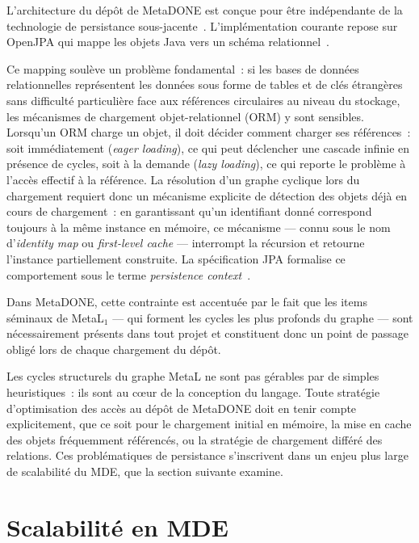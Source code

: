 L'architecture du dépôt de MetaDONE est conçue pour être indépendante de la technologie de persistance sous-jacente~\cite{Eng2007}. L'implémentation courante repose sur OpenJPA qui mappe les objets Java vers un schéma relationnel~\cite{jpa2013}.

Ce mapping soulève un problème fondamental~: si les bases de données relationnelles représentent les données sous forme de tables et de clés étrangères sans difficulté particulière face aux références circulaires au niveau du stockage, les mécanismes de chargement objet-relationnel (ORM) y sont sensibles. Lorsqu'un ORM charge un objet, il doit décider comment charger ses références~: soit immédiatement (\textit{eager loading}), ce qui peut déclencher une cascade infinie en présence de cycles, soit à la demande (\textit{lazy loading}), ce qui reporte le problème à l'accès effectif à la référence. La résolution d'un graphe cyclique lors du chargement requiert donc un mécanisme explicite de détection des objets déjà en cours de chargement~: en garantissant qu'un identifiant donné correspond toujours à la même instance en mémoire, ce mécanisme --- connu sous le nom d'\textit{identity map} ou \textit{first-level cache} --- interrompt la récursion et retourne l'instance partiellement construite. La spécification JPA formalise ce comportement sous le terme \textit{persistence context}~\cite{jpa2013}.

Dans MetaDONE, cette contrainte est accentuée par le fait que les items séminaux de MetaL$_1$ --- qui forment les cycles les plus profonds du graphe --- sont nécessairement présents dans tout projet et constituent donc un point de passage obligé lors de chaque chargement du dépôt.

Les cycles structurels du graphe MetaL ne sont pas gérables par de simples heuristiques~: ils sont au cœur de la conception du langage. Toute stratégie d'optimisation des accès au dépôt de MetaDONE doit en tenir compte explicitement, que ce soit pour le chargement initial en mémoire, la mise en cache des objets fréquemment référencés, ou la stratégie de chargement différé des relations. Ces problématiques de persistance s'inscrivent dans un enjeu plus large de scalabilité du MDE, que la section suivante examine.

\section{Scalabilité en MDE}
\label{sec:scalabilite-mde}

